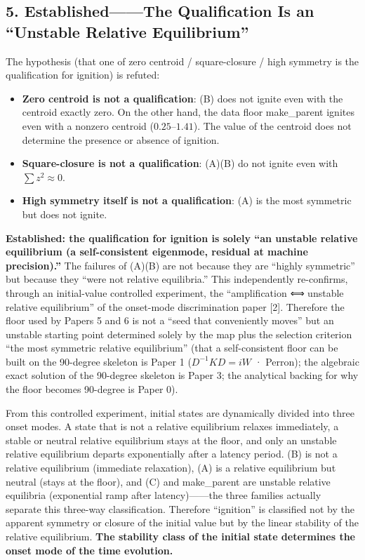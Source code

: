 \documentclass[
  a4paper,
]{ltjsarticle}
\providecommand{\tightlist}{%
  \setlength{\itemsep}{0pt}\setlength{\parskip}{0pt}}
\begin{document}
\subsection{5. Established------The Qualification Is an ``Unstable
Relative
Equilibrium''}\label{establishedthe-qualification-is-an-unstable-relative-equilibrium}

The hypothesis (that one of zero centroid / square-closure / high
symmetry is the qualification for ignition) is refuted:

\begin{itemize}
\tightlist
\item
  \textbf{Zero centroid is not a qualification}: (B) does not ignite
  even with the centroid exactly zero. On the other hand, the data floor
  make\_parent ignites even with a nonzero centroid
  (\(0.25\)--\(1.41\)). The value of the centroid does not determine the
  presence or absence of ignition.
\item
  \textbf{Square-closure is not a qualification}: (A)(B) do not ignite
  even with \(\sum z^2\approx0\).
\item
  \textbf{High symmetry itself is not a qualification}: (A) is the most
  symmetric but does not ignite.
\end{itemize}

\textbf{Established: the qualification for ignition is solely ``an
unstable relative equilibrium (a self-consistent eigenmode, residual at
machine precision).''} The failures of (A)(B) are not because they are
``highly symmetric'' but because they ``were not relative equilibria.''
This independently re-confirms, through an initial-value controlled
experiment, the ``amplification ⟺ unstable relative equilibrium'' of the
onset-mode discrimination paper {[}2{]}. Therefore the floor used by
Papers 5 and 6 is not a ``seed that conveniently moves'' but an unstable
starting point determined solely by the map plus the selection criterion
``the most symmetric relative equilibrium'' (that a self-consistent
floor can be built on the 90-degree skeleton is Paper 1 (\(D^{-1}KD=iW\)
· Perron); the algebraic exact solution of the 90-degree skeleton is
Paper 3; the analytical backing for why the floor becomes 90-degree is
Paper 0).

From this controlled experiment, initial states are dynamically divided
into three onset modes. A state that is not a relative equilibrium
relaxes immediately, a stable or neutral relative equilibrium stays at
the floor, and only an unstable relative equilibrium departs
exponentially after a latency period. (B) is not a relative equilibrium
(immediate relaxation), (A) is a relative equilibrium but neutral (stays
at the floor), and (C) and make\_parent are unstable relative equilibria
(exponential ramp after latency)------the three families actually
separate this three-way classification. Therefore ``ignition'' is
classified not by the apparent symmetry or closure of the initial value
but by the linear stability of the relative equilibrium. \textbf{The
stability class of the initial state determines the onset mode of the
time evolution.}
\end{document}
